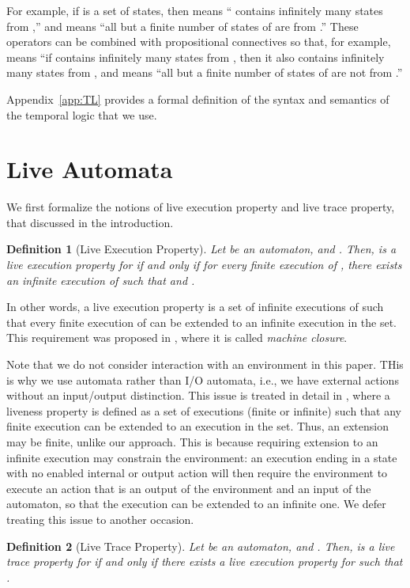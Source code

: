 \documentclass[11pt]{article}
\newcommand{\bd}{\begin{definition}}
\newcommand{\ed}{\end{definition}}
\newtheorem{definition}{Definition}
\begin{document}
For example, if  is a set of states, then
 means `` contains infinitely many states from ,''
and
 means ``all but a finite number of states of
                           are from .'' 
These operators can be combined with propositional connectives
 so that, for example,
 means ``if  contains
infinitely many states from , then it also contains 
infinitely many states from ,
and
 means ``all but a finite number of states of
                                are not from .'' 

Appendix~\ref{app:TL} provides a formal definition of the syntax and
semantics of the temporal logic that we use.


\section{Live Automata}
\label{sec:live-automata}

We first formalize the notions of live execution property and live
trace property, that discussed in the introduction.


\bd[Live Execution Property]
\label{def:liveness-property}
Let  be an automaton, and . Then,
 is a \emph{live execution property} for  if and only if
for every finite execution  of , there exists an infinite
execution  of  such that
 and .
\ed
In other words, a live execution property is a set of infinite
executions of  such that every finite execution of  can be
extended to an infinite execution in the set.
This requirement was proposed in \cite{AL91}, where it is called
\emph{machine closure}.

Note that we do not consider interaction with an environment in this
paper. THis is why we use automata rather than I/O automata, i.e., we
have external actions without an input/output distinction.
This issue is treated in detail in \cite{GSSL98}, where a
liveness property is defined as a set of executions (finite or
infinite) such that 
any finite execution can be extended to an execution in the set.
Thus, an extension may be finite, unlike our approach. This is because
requiring extension to an infinite execution may constrain the
environment: an execution ending in a state with no enabled internal
or output action will then require the environment to execute an
action that is an output of the environment and an input of the
automaton, so that the execution can be extended to an infinite one. 
We defer treating this issue to another occasion.


\bd[Live Trace Property]
\label{def:live-trace-property}
Let  be an automaton, and . Then,
 is a \emph{live trace property} for  if and only if
there exists a live execution property  for  such that 
.
\ed
\end{document}
